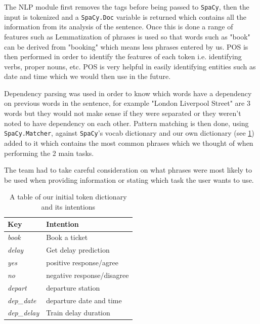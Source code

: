 \documentclass[11pt]{article}
\newcommand{\code}[1]{{\texttt{#1}}}
\begin{document}
        
        The NLP module first removes the tags before being passed to \code{SpaCy}, then the input is tokenized and a \code{SpaCy.Doc} variable is returned which contains all the information from its analysis of the sentence. Once this is done a range of features such as Lemmatization of phrases is used so that words such as "book" can be derived from "booking" which means less phrases entered by us. POS is then performed in order to identify the features of each token i.e. identifying verbs, proper nouns, etc. POS is very helpful in easily identifying entities such as date and time which we would then use in the future.
        
        Dependency parsing was used in order to know which words have a dependency on previous words in the sentence, for example "London Liverpool Street" are 3 words but they would not make sense if they were separated or they weren't noted to have dependency on each other. Pattern matching is then done, using \code{SpaCy.Matcher}, against \code{SpaCy}'s vocab dictionary and our own dictionary (see \cref{tab:DesignTokenDict}) added to it which contains the most common phrases which we thought of when performing the 2 main tasks.
        
        The team had to take careful consideration on what phrases were most likely to be used when providing information or stating which task the user wants to use. 
        
    
    \begin{table}[!ht]
\centering
\begin{tabular}{|l|l|}
\hline
\textbf{Key}       & \textbf{Intention}         \\ \hline
\textit{book}      & Book a ticket              \\ \hline
\textit{delay}     & Get delay prediction       \\ \hline
\textit{yes}       & positive response/agree    \\ \hline
\textit{no}        & negative response/disagree \\ \hline
\textit{depart}    & departure station          \\ \hline
\textit{dep\_date} & departure date and time    \\ \hline
\textit{dep\_delay} & Train delay duration       \\ \hline
\end{tabular}
\caption{A table of our initial token dictionary and its intentions}
\label{tab:DesignTokenDict}
\end{table}
\end{document}
